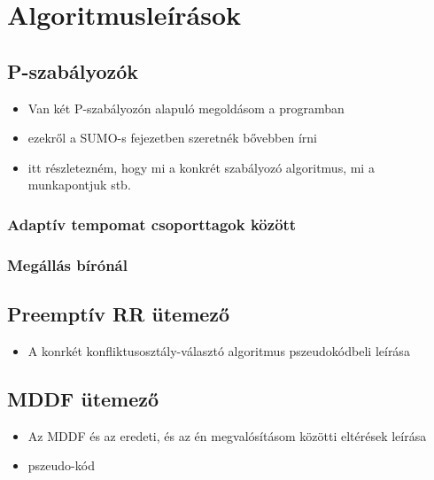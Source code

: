 \documentclass{report}
\begin{document}
		\section{Algoritmusleírások}
			\subsection{P-szabályozók}
				\begin{itemize}
					\item Van két P-szabályozón alapuló megoldásom a programban
					\item ezekről a SUMO-s fejezetben szeretnék bővebben írni
					\item itt részletezném, hogy mi a konkrét szabályozó algoritmus, mi a munkapontjuk stb.
				\end{itemize}
				\subsubsection{Adaptív tempomat csoporttagok között}
				\subsubsection{Megállás bírónál}
			\subsection{Preemptív RR ütemező}
				\begin{itemize}
					\item A konrkét konfliktusosztály-választó algoritmus pszeudokódbeli leírása
				\end{itemize}
			\subsection{MDDF ütemező}
				\begin{itemize}
					\item Az MDDF és az eredeti, és az én megvalósításom közötti eltérések leírása
					\item pszeudo-kód
				\end{itemize}
\end{document}
